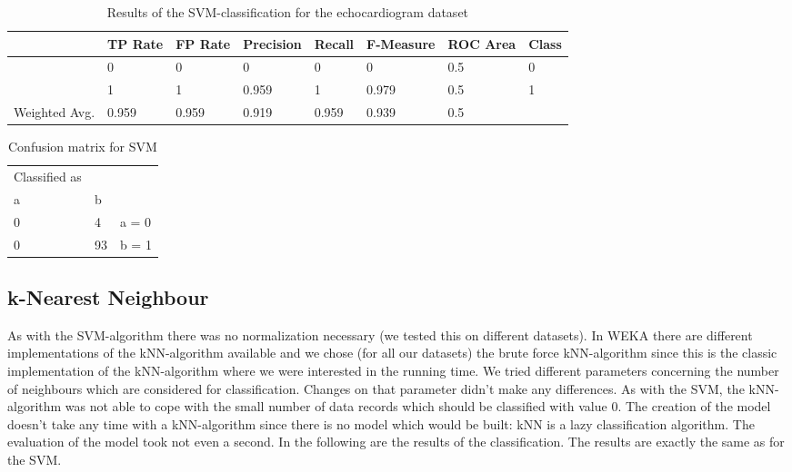 \documentclass[paper=a4, fontsize=11pt]{scrartcl} %
\numberwithin{equation}{section} %
\numberwithin{figure}{section} %
\numberwithin{table}{section} %
\begin{document}
\begin{table}[h]
\centering
\begin{tabular}{|llllllll|}
	\hline
									&TP Rate   	&FP Rate   &Precision   &Recall  &F-Measure   &ROC Area  &Class\\
	\hline
									&0         	&0         &0         	&0       &  0         & 0.5      &0\\
  								&1         	&1         &0.959     	&1       &0.979       &	0.5      &1\\
  \hline
	Weighted Avg.		&0.959     	&0.959     &0.919   		&0.959   &0.939     	&0.5	&\\
	\hline
\end{tabular}
\caption{Results of the SVM-classification for the echocardiogram dataset}
\end{table}

\vspace{6pt}

\begin{table}[h]
\centering
\begin{tabular}{|lll|}
	\hline
	Classified as	& &\\
	a		&	b & \\
	\hline
	0   & 4  	&  a = 0\\
  0   & 93 	&  b = 1\\
  \hline
\end{tabular}
\caption{Confusion matrix for SVM}
\end{table}

\subsection{k-Nearest Neighbour}

As with the SVM-algorithm there was no normalization necessary (we tested this on different datasets). In WEKA there are different implementations of the kNN-algorithm available and we chose (for all our datasets) the brute force kNN-algorithm since this is the classic implementation of the kNN-algorithm where we were interested in the running time. We tried different parameters concerning the number of neighbours which are considered for classification. Changes on that parameter didn't make any differences. As with the SVM, the kNN-algorithm was not able to cope with the small number of data records which should be classified with value 0. The creation of the model doesn't take any time with a kNN-algorithm since there is no model which would be built: kNN is a lazy classification algorithm. The evaluation of the model took not even a second. In the following are the results of the classification. The results are exactly the same as for the SVM.
\end{document}
